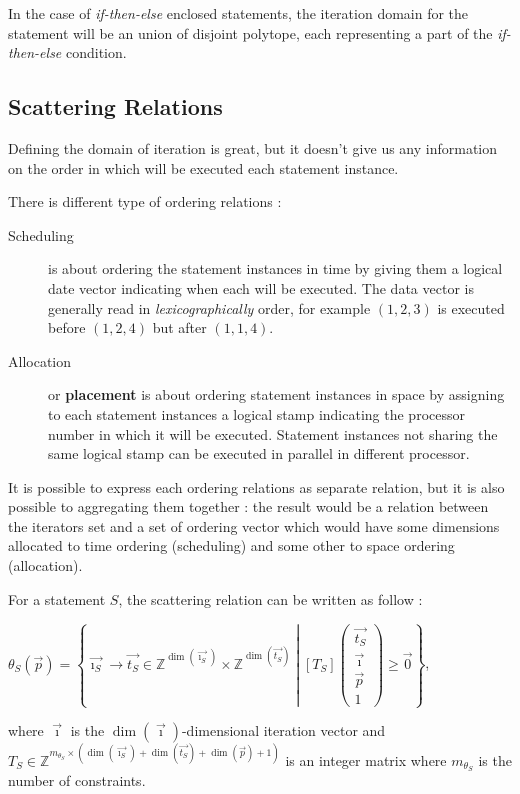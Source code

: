 \documentclass[paper=a4, fontsize=11pt]{scrartcl}
\numberwithin{equation}{section}        %
\numberwithin{figure}{section}          %
\numberwithin{table}{section}               %
\begin{document}
        In the case of \textit{if-then-else} enclosed statements, the iteration domain
        for the statement will be an union of disjoint polytope, each representing a part
        of the \textit{if-then-else} condition.

    \subsection{Scattering Relations}
        Defining the domain of iteration is great, but it doesn't give us any information
        on the order in which will be executed each statement instance.

        There is different type of ordering relations :
        \begin{description}
            \item[Scheduling] is about ordering the statement instances in time by
                giving them a logical date vector indicating when each will be executed.
                The data vector is generally read in \textit{lexicographically} order, for example
                $(1,2,3)$ is executed before $(1,2,4)$ but after $(1,1,4)$.
            \item[Allocation] or \textbf{placement} is about ordering statement instances
                in space by assigning to each statement instances a logical stamp
                indicating the processor number in which it will be executed.
                Statement instances not sharing the same logical stamp can be
                executed in parallel in different processor.
        \end{description}

        It is possible to express each ordering relations as separate relation,
        but it is also possible to aggregating them together : the result would be
        a relation between the iterators set and a set of ordering vector which
        would have some dimensions allocated to time ordering (scheduling) and
        some other to space ordering (allocation).

        For a statement $S$, the scattering relation can be written as follow :
        \begin{center}
            $\theta_S(\vec{p}) = \left\{\vec{\imath_S} \to \vec{t_S} \in \mathbb{Z}^{\dim(\vec{\imath_S})}\times\mathbb{Z}^{\dim(\vec{t_S})}
            \middle|
            \left[T_S\right]\begin{pmatrix}\vec{t_S}\\ \vec{\imath} \\ \vec{p} \\ 1\end{pmatrix}
            \geq \vec{0}
            \right\}$,
        \end{center}
        where $\vec{\imath}$ is the $\dim(\vec{\imath})$-dimensional iteration vector
        and $T_S \in \mathbb{Z}^{m_{\theta_S}\times(\dim(\vec{\imath_S})+\dim(\vec{t_S})+\dim(\vec{p})+1)}$
        is an integer matrix where $m_{\theta_S}$ is the number of constraints.
\end{document}
